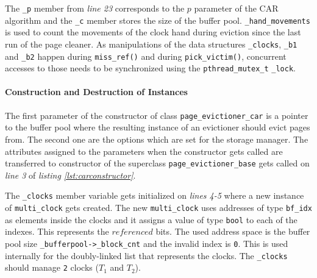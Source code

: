     The \lstinline{_p} member from \emph{line 23} corresponds to the $p$ parameter of the CAR algorithm and the \lstinline{_c} member stores the size of the buffer pool. \lstinline{_hand_movements} is used to count the movements of the clock hand during eviction since the last run of the page cleaner. As manipulations of the data structures \lstinline{_clocks}, \lstinline{_b1} and \lstinline{_b2} happen during \lstinline{miss_ref()} and during \lstinline{pick_victim()}, concurrent accesses to those needs to be synchronized using the \lstinline{pthread_mutex_t} \lstinline{_lock}.

\paragraph{Construction and Destruction of Instances}

\begin{@empty}
    \lstset{
        language = [ISO]C++,
        style = basic
    }
    \begin{code}[ht!]
        \caption{Constructor and Destructor of the Class \lstinline{page_evictioner_car}} \label{lst:carconstructor}
        
    \end{code}
\end{@empty}

    The first parameter of the constructor of class \lstinline{page_evictioner_car} is a pointer to the buffer pool where the resulting instance of an evictioner should evict pages from. The second one are the options which are set for the storage manager. The attributes assigned to the parameters when the constructor gets called are transferred to constructor of the superclass \lstinline{page_evictioner_base} gets called on \emph{line 3} of \emph{listing \ref{lst:carconstructor}}.

    The \lstinline{_clocks} member variable gets initialized on \emph{lines 4-5} where a new instance of \lstinline{multi_clock} gets created. The new \lstinline{multi_clock} uses addresses of type \lstinline{bf_idx} as elements inside the clocks and it assigns a value of type \lstinline{bool} to each of the indexes. This represents the $referenced$ bits. The used address space is the buffer pool size \lstinline{_bufferpool->_block_cnt} and the invalid index is \lstinline{0}. This is used internally for the doubly-linked list that represents the clocks. The \lstinline{_clocks} should manage \lstinline{2} clocks ($T_1$ and $T_2$).

